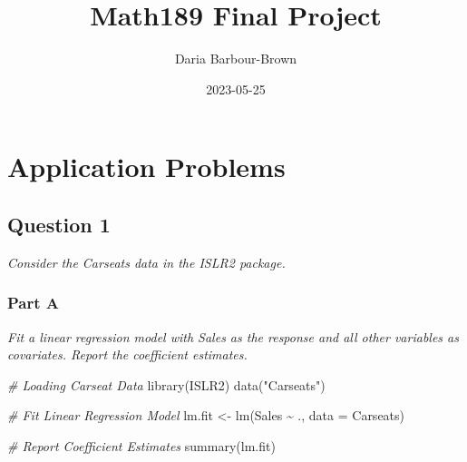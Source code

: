 \documentclass[
]{article}
\title{Math189 Final Project}
\author{Daria Barbour-Brown}
\date{2023-05-25}
\newenvironment{Shaded}{\begin{snugshade}}{\end{snugshade}}
\newcommand{\AttributeTok}[1]{\textcolor[rgb]{0.77,0.63,0.00}{#1}}
\newcommand{\CommentTok}[1]{\textcolor[rgb]{0.56,0.35,0.01}{\textit{#1}}}
\newcommand{\FunctionTok}[1]{\textcolor[rgb]{0.00,0.00,0.00}{#1}}
\newcommand{\NormalTok}[1]{#1}
\newcommand{\OtherTok}[1]{\textcolor[rgb]{0.56,0.35,0.01}{#1}}
\newcommand{\SpecialCharTok}[1]{\textcolor[rgb]{0.00,0.00,0.00}{#1}}
\newcommand{\StringTok}[1]{\textcolor[rgb]{0.31,0.60,0.02}{#1}}
\begin{document}
\maketitle

\hypertarget{application-problems}{%
\section{Application Problems}\label{application-problems}}

\hypertarget{question-1}{%
\subsection{Question 1}\label{question-1}}

\emph{Consider the Carseats data in the ISLR2 package.}

\hypertarget{part-a}{%
\subsubsection{Part A}\label{part-a}}

\emph{Fit a linear regression model with Sales as the response and all
other variables as covariates. Report the coefficient estimates.}

\begin{Shaded}
\begin{Highlighting}[]
\CommentTok{\# Loading Carseat Data}
\FunctionTok{library}\NormalTok{(ISLR2)}
\FunctionTok{data}\NormalTok{(}\StringTok{"Carseats"}\NormalTok{)}
\end{Highlighting}
\end{Shaded}

\begin{Shaded}
\begin{Highlighting}[]
\CommentTok{\# Fit Linear Regression Model}
\NormalTok{lm.fit }\OtherTok{\textless{}{-}} \FunctionTok{lm}\NormalTok{(Sales }\SpecialCharTok{\textasciitilde{}}\NormalTok{ ., }\AttributeTok{data =}\NormalTok{ Carseats)}

\CommentTok{\# Report Coefficient Estimates}
\FunctionTok{summary}\NormalTok{(lm.fit)}
\end{Highlighting}
\end{Shaded}
\end{document}
